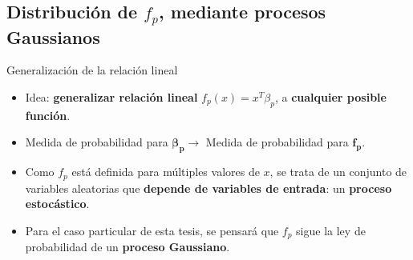 \documentclass{beamer}
\begin{document}
\subsection{Distribuci\'on de $f_p$, mediante procesos Gaussianos}

\begin{frame}{Generalizaci\'on de la relaci\'on lineal}
\begin{itemize}
  \setlength\itemsep{2em}
    \item{Idea: \textbf{generalizar relaci\'on lineal} $f_p(x) = x^T\beta_p$, a \textbf{cualquier posible funci\'on}.} 
    
    \item{Medida de probabilidad para $\bm{\beta_p} \rightarrow$  Medida de probabilidad para $\bm{f_p}$. } 
    
    \item{Como $f_p$ est\'a definida para m\'ultiples valores de $x$, se trata de un conjunto de variables aleatorias que \textbf{depende de variables de entrada}: un \textbf{proceso estoc\'astico}. } 
    
    \item{Para el caso particular de esta tesis, se pensar\'a que  $f_p$ sigue la ley de probabilidad de un \textbf{proceso Gaussiano}.} 
\end{itemize}
\end{frame}


\end{document}
